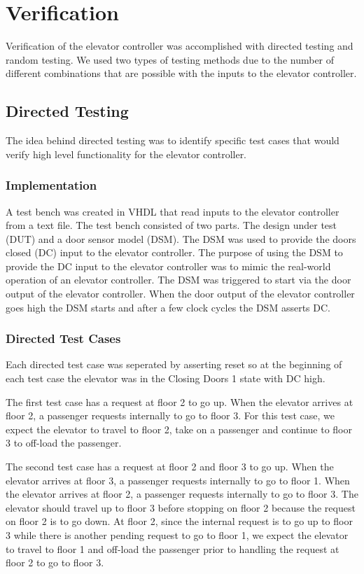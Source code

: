 \documentclass[journal]{IEEEtran}
\begin{document}
\section{Verification}
Verification of the elevator controller was accomplished with directed testing and random testing. We used two types of testing methods due to the number of different combinations that are possible with the inputs to the elevator controller.

\subsection{Directed Testing}

The idea behind directed testing was to identify specific test cases that would verify high level functionality for the elevator controller.

\subsubsection{Implementation}
A test bench was created in VHDL that read inputs to the elevator controller from a text file. The test bench consisted of two parts. The design under test (DUT) and a door sensor model (DSM). The DSM was used to provide the doors closed (DC) input to the elevator controller. The purpose of using the DSM to provide the DC input to the elevator controller was to mimic the real-world operation of an elevator controller. The DSM was triggered to start via the door output of the elevator controller. When the door output of the elevator controller goes high the DSM starts and after a few clock cycles the DSM asserts DC.

\subsubsection{Directed Test Cases}
Each directed test case was seperated by asserting reset so at the beginning of each test case the elevator was in the Closing Doors 1 state with DC high.

The first test case has a request at floor 2 to go up. When the elevator arrives at floor 2, a passenger requests internally to go to floor 3. For this test case, we expect the elevator to travel to floor 2, take on a passenger and continue to floor 3 to off-load the passenger.

The second test case has a request at floor 2 and floor 3 to go up. When the elevator arrives at floor 3, a passenger requests internally to go to floor 1. When the elevator arrives at floor 2, a passenger requests internally to go to floor 3. The elevator should travel up to floor 3 before stopping on floor 2 because the request on floor 2 is to go down. At floor 2, since the internal request is to go up to floor 3 while there is another pending request to go to floor 1, we expect the elevator to travel to floor 1 and off-load the passenger prior to handling the request at floor 2 to go to floor 3. 
\end{document}
